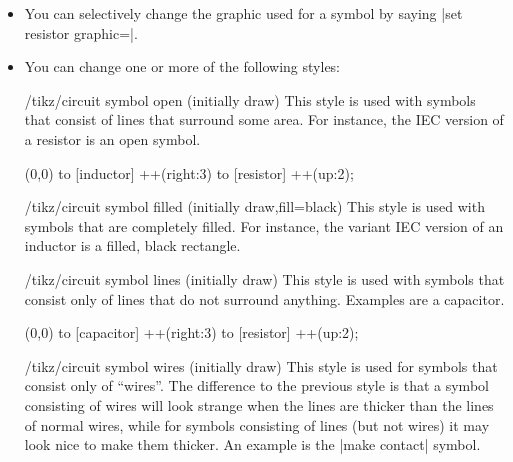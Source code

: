 \begin{itemize}
\begin{codeexample}[preamble={\usetikzlibrary{circuits.ee.IEC}}]
\end{codeexample}
    \item You can selectively change the graphic used for a symbol by saying
        |set resistor graphic=|.
    \item You can change one or more of the following styles:
        \begin{stylekey}{/tikz/circuit symbol open (initially draw)}
            This style is used with symbols that consist of lines that surround
            some area. For instance, the IEC version of a resistor is an open
            symbol.
\begin{codeexample}[preamble={\usetikzlibrary{circuits.ee.IEC}}]
\tikz [circuit ee IEC,
       circuit symbol open/.style={thick,draw,fill=yellow}]
  \draw (0,0) to [inductor] ++(right:3) to [resistor] ++(up:2);
\end{codeexample}
        \end{stylekey}
        \begin{stylekey}{/tikz/circuit symbol filled (initially {draw,fill=black})}
            This style is used with symbols that are completely filled. For
            instance, the variant IEC version of an inductor is a filled, black
            rectangle.
        \end{stylekey}
        \begin{stylekey}{/tikz/circuit symbol lines (initially draw)}
            This style is used with symbols that consist only of lines that do
            not surround anything. Examples are a capacitor.
\begin{codeexample}[preamble={\usetikzlibrary{circuits.ee.IEC}}]
\tikz [circuit ee IEC,
       circuit symbol lines/.style={thick,draw=red}]
  \draw (0,0) to [capacitor] ++(right:3) to [resistor] ++(up:2);
\end{codeexample}
        \end{stylekey}
        \begin{stylekey}{/tikz/circuit symbol wires (initially draw)}
            This style is used for symbols that consist only of ``wires''. The
            difference to the previous style is that a symbol consisting of
            wires will look strange when the lines are thicker than the lines
            of normal wires, while for symbols consisting of lines (but not
            wires) it may look nice to make them thicker. An example is the
            |make contact| symbol.


\end{stylekey}
\end{itemize}

